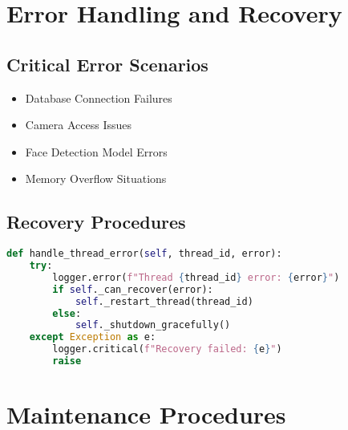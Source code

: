 \documentclass[11pt,a4paper]{report}
\begin{document}
\chapter{Error Handling and Recovery}

\section{Critical Error Scenarios}
\begin{itemize}
    \item Database Connection Failures
    \item Camera Access Issues
    \item Face Detection Model Errors
    \item Memory Overflow Situations
\end{itemize}

\section{Recovery Procedures}
\begin{lstlisting}[language=Python]
def handle_thread_error(self, thread_id, error):
    try:
        logger.error(f"Thread {thread_id} error: {error}")
        if self._can_recover(error):
            self._restart_thread(thread_id)
        else:
            self._shutdown_gracefully()
    except Exception as e:
        logger.critical(f"Recovery failed: {e}")
        raise
\end{lstlisting}

\chapter{Maintenance Procedures}
\end{document}
